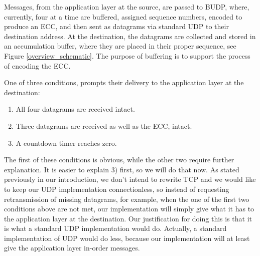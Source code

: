 \documentclass[conference]{IEEEtran}
\theoremstyle{definition}
\begin{document}





Messages, from the application layer at the source, are passed to
BUDP, where, currently, four at a time are buffered,
assigned sequence numbers, encoded to produce an ECC,
and then sent as datagrams via standard UDP to their
destination address. At the destination, the datagrams
are collected and stored in an accumulation buffer,
where they are placed in their proper sequence, see
Figure \ref{overview_schematic}.  The purpose of
buffering is to support the process of encoding the ECC.


One of three conditions,
prompts their delivery to the application layer at the
destination:\\

\begin{enumerate}
 \item All four datagrams are received intact.
 \item Three datagrams are received as well as
       the ECC, intact.
 \item A countdown timer reaches zero.\\
\end{enumerate}

\noindent The first of these conditions is obvious, while
the other two require further explanation.  It
is easier to explain 3) first, so we will do
that now.  As stated previously in our introduction,
we don't intend to rewrite TCP and we would like
to keep our UDP implementation connectionless,
so instead of requesting retransmission of
missing datagrams, for example, when the one of
the first two conditions above are not met, our
implementation will simply give what it has to
the application layer at the destination.  Our
justification for doing this is that it is what
a standard UDP implementation would do.  Actually,
a standard implementation of UDP would do less,
because our implementation will at least give the
application layer in-order messages.

\end{document}
